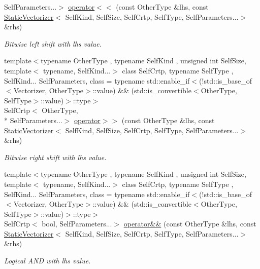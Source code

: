 \begin{DoxyCompactItemize}
Self\-Parameters...$>$ \hyperlink{namespacemagrathea_afe50847f844046c38c7530a7ae7ff7a8}{operator$<$$<$} (const Other\-Type \&lhs, const \hyperlink{classmagrathea_1_1StaticVectorizer}{Static\-Vectorizer}$<$ Self\-Kind, Self\-Size, Self\-Crtp, Self\-Type, Self\-Parameters...$>$ \&rhs)
\begin{DoxyCompactList}\small\item\em Bitwise left shift with lhs value. \end{DoxyCompactList}\item 
{\footnotesize template$<$typename Other\-Type , typename Self\-Kind , unsigned int Self\-Size, template$<$ typename, Self\-Kind...$>$ class Self\-Crtp, typename Self\-Type , Self\-Kind... Self\-Parameters, class  = typename std\-::enable\-\_\-if$<$(!std\-::is\-\_\-base\-\_\-of$<$\-Vectorizer, Other\-Type$>$\-::value) \&\& (std\-::is\-\_\-convertible$<$\-Other\-Type, Self\-Type$>$\-::value)$>$\-::type$>$ }\\Self\-Crtp$<$ Other\-Type, \\*
Self\-Parameters...$>$ \hyperlink{namespacemagrathea_a055bad44e7477b054c6756cfff0d7918}{operator$>$$>$} (const Other\-Type \&lhs, const \hyperlink{classmagrathea_1_1StaticVectorizer}{Static\-Vectorizer}$<$ Self\-Kind, Self\-Size, Self\-Crtp, Self\-Type, Self\-Parameters...$>$ \&rhs)
\begin{DoxyCompactList}\small\item\em Bitwise right shift with lhs value. \end{DoxyCompactList}\item 
{\footnotesize template$<$typename Other\-Type , typename Self\-Kind , unsigned int Self\-Size, template$<$ typename, Self\-Kind...$>$ class Self\-Crtp, typename Self\-Type , Self\-Kind... Self\-Parameters, class  = typename std\-::enable\-\_\-if$<$(!std\-::is\-\_\-base\-\_\-of$<$\-Vectorizer, Other\-Type$>$\-::value) \&\& (std\-::is\-\_\-convertible$<$\-Other\-Type, Self\-Type$>$\-::value)$>$\-::type$>$ }\\Self\-Crtp$<$ bool, Self\-Parameters...$>$ \hyperlink{namespacemagrathea_a9461803b62888f1cee4f5391c2c3d01f}{operator\&\&} (const Other\-Type \&lhs, const \hyperlink{classmagrathea_1_1StaticVectorizer}{Static\-Vectorizer}$<$ Self\-Kind, Self\-Size, Self\-Crtp, Self\-Type, Self\-Parameters...$>$ \&rhs)
\begin{DoxyCompactList}\small\item\em Logical A\-N\-D with lhs value. \end{DoxyCompactList}\item 

\end{DoxyCompactItemize}
